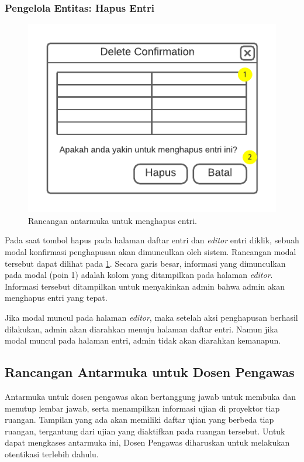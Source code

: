     
\subsubsection{Pengelola Entitas: Hapus Entri}
    \begin{figure}
        \centering
        \includegraphics{Gambar/mockups/Mockup--Admin - Entity Delete.pdf}
        \caption{Rancangan antarmuka untuk menghapus entri.}
        \label{fig:mockup_admin_entity_delete}
    \end{figure}
    Pada saat tombol hapus pada halaman daftar entri dan \textit{editor} entri
    diklik, sebuah modal konfirmasi penghapusan akan dimunculkan oleh sistem.
    Rancangan modal tersebut dapat dilihat pada
    \ref{fig:mockup_admin_entity_delete}. Secara garis besar, informasi yang
    dimunculkan pada modal (poin 1) adalah kolom yang ditampilkan pada halaman
    \textit{editor}. Informasi tersebut ditampilkan untuk menyakinkan admin
    bahwa admin akan menghapus entri yang tepat.
    
    Jika modal muncul pada halaman \textit{editor}, maka setelah aksi
    penghapusan berhasil dilakukan, admin akan diarahkan menuju halaman daftar
    entri. Namun jika modal muncul pada halaman entri, admin tidak akan
    diarahkan kemanapun.
    
\subsection{Rancangan Antarmuka untuk Dosen Pengawas}
    Antarmuka untuk dosen pengawas akan bertanggung jawab untuk membuka dan
    menutup lembar jawab, serta menampilkan informasi ujian di proyektor tiap
    ruangan. Tampilan yang ada akan memiliki daftar ujian yang berbeda tiap
    ruangan, tergantung dari ujian yang diaktifkan pada ruangan tersebut.
    Untuk dapat mengkases antarmuka ini, Dosen Pengawas diharuskan untuk
    melakukan otentikasi terlebih dahulu.
    
